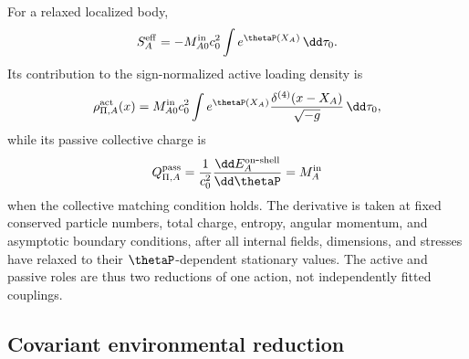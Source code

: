 \documentclass[12pt]{article}
\begin{document}
For a relaxed localized body,
\begin{equation}
    S_A^{\rm eff}
    =-M_{A0}^{\rm in}c_0^2
    \int e^{\thetaP(X_A)}\,\dd\tau_0 .
    \label{eq:normalized-classical-target-action}
\end{equation}
Its contribution to the sign-normalized active loading density is
\begin{equation}
    \rho_{\Pi,A}^{\rm act}(x)
    =M_{A0}^{\rm in}c_0^2
    \int e^{\thetaP(X_A)}
    \frac{\delta^{(4)}(x-X_A)}{\sqrt{-g}}\,\dd\tau_0,
    \label{eq:worldline-active-source}
\end{equation}
while its passive collective charge is
\begin{equation}
    Q_{\Pi,A}^{\rm pass}
    =\frac{1}{c_0^2}
    \frac{\dd E_A^{\rm on\mbox{-}shell}}{\dd\thetaP}
    =M_A^{\rm in}
    \label{eq:normalized-classical-target-charge}
\end{equation}
when the collective matching condition holds.  The derivative is taken at fixed conserved particle numbers, total charge, entropy, angular momentum, and asymptotic boundary conditions, after all internal fields, dimensions, and stresses have relaxed to their \(\thetaP\)-dependent stationary values.  The active and passive roles are thus two reductions of one action, not independently fitted couplings.

\subsection{Covariant environmental reduction}
\end{document}
